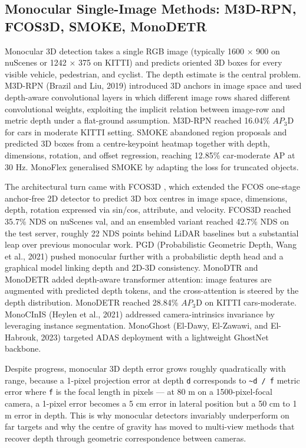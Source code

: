 \documentclass{article}
\begin{document}
\subsection{Monocular Single-Image Methods: M3D-RPN, FCOS3D, SMOKE, MonoDETR}\label{monocular-single-image-methods-m3d-rpn-fcos3d-smoke-monodetr}

Monocular 3D detection takes a single RGB image (typically 1600 × 900 on nuScenes or 1242 × 375 on KITTI) and predicts oriented 3D boxes for every visible vehicle, pedestrian, and cyclist. The depth estimate is the central problem. M3D-RPN (Brazil and Liu, 2019) introduced 3D anchors in image space and used depth-aware convolutional layers in which different image rows shared different convolutional weights, exploiting the implicit relation between image-row and metric depth under a flat-ground assumption. M3D-RPN reached 16.04\% \(AP_3\)D for cars in moderate KITTI setting. SMOKE \citep{liu2020tanetrobust3dobjec} abandoned region proposals and predicted 3D boxes from a centre-keypoint heatmap together with depth, dimensions, rotation, and offset regression, reaching 12.85\% car-moderate AP at 30 Hz. MonoFlex generalised SMOKE by adapting the loss for truncated objects.

The architectural turn came with FCOS3D \citep{wang2021fcos3dfullyconvolu}, which extended the FCOS one-stage anchor-free 2D detector to predict 3D box centres in image space, dimensions, depth, rotation expressed via sin/cos, attribute, and velocity. FCOS3D reached 35.7\% NDS on nuScenes val, and an ensembled variant reached 42.7\% NDS on the test server, roughly 22 NDS points behind LiDAR baselines but a substantial leap over previous monocular work. PGD (Probabilistic Geometric Depth, Wang et al., 2021) pushed monocular further with a probabilistic depth head and a graphical model linking depth and 2D-3D consistency. MonoDTR \citep{huang2022monodtrmonocular3d} and MonoDETR \citep{zhang2022monodetrdepthguide} added depth-aware transformer attention: image features are augmented with predicted depth tokens, and the cross-attention is steered by the depth distribution. MonoDETR reached 28.84\% \(AP_3\)D on KITTI cars-moderate. MonoCInIS (Heylen et al., 2021) addressed camera-intrinsics invariance by leveraging instance segmentation. MonoGhost (El-Dawy, El-Zawawi, and El-Habrouk, 2023) targeted ADAS deployment with a lightweight GhostNet backbone.

Despite progress, monocular 3D depth error grows roughly quadratically with range, because a 1-pixel projection error at depth \texttt{d} corresponds to \texttt{\textasciitilde{}d\ /\ f} metric error where \texttt{f} is the focal length in pixels --- at 80 m on a 1500-pixel-focal camera, a 1-pixel error becomes a 5 cm error in lateral position but a 50 cm to 1 m error in depth. This is why monocular detectors invariably underperform on far targets and why the centre of gravity has moved to multi-view methods that recover depth through geometric correspondence between cameras.
\end{document}
